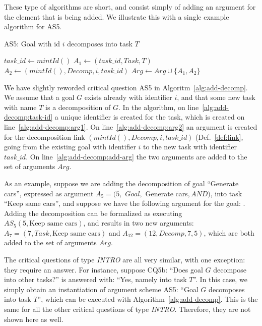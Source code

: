 These type of algorithms are short, and consist simply of adding an argument for the element that is being added. We illustrate this with a single example algorithm for AS5.

\begin{algorithm}[h]
  \caption{AS5: Goal with id $i$ decomposes into task $T$}\label{alg:add-decomp}
  \begin{algorithmic}[1]
    \State $task\_id\gets mintId()$\label{alg:add-decomp:task-id}
    \State $A_1\leftarrow (task\_id, Task, T)$\label{alg:add-decomp:arg1}
    \State $A_2\leftarrow (mintId(), Decomp, i, task\_id)$\label{alg:add-decomp:arg2}
    \State $Arg\gets Arg\cup \{A_1,A_2\}$\label{alg:add-decomp:add-arg}
    \EndProcedure
  \end{algorithmic}
\end{algorithm}

We have slightly reworded critical question AS5 in Algoritm~\ref{alg:add-decomp}. We assume that a goal $G$ exists already with identifier $i$, and that some new task with name $T$ is a decomposition of $G$. In the algorithm, on line~\ref{alg:add-decomp:task-id} a unique identifier is created for the task, which is created on line~\ref{alg:add-decomp:arg1}. On line~\ref{alg:add-decomp:arg2} an argument is created for the decomposition link $(mintId(), Decomp, i, task\_id)$ (Def.~\ref{def:link}, going from the existing goal with identifier $i$ to the new task with identifier $task\_id$. On line~\ref{alg:add-decomp:add-arg} the two arguments are added to the set of arguments $Arg$.

As an example, suppose we are adding the decomposition of goal ``Generate cars'', expressed as argument $A_5 = (5,$ $Goal,$ Generate cars$, AND)$, into task ``Keep same cars'', and suppose we have the following argument for the goal: . Adding the decomposition can be formalized as executing $AS_5(5, \text{Keep same cars})$, and results in two new arguments: $A_7 = (7, Task, \text{Keep same cars})$ and $A_{12} = (12, Decomp, 7, 5)$, which are both added to the set of arguments $Arg$.

The critical questions of type \emph{INTRO} are all very similar, with one exception: they require an answer. For instance, suppose CQ5b: ``Does goal $G$ decompose into other tasks?'' is answered with: ``Yes, namely into task $T$''. In this case, we simply obtain an instantiation of argument scheme AS5: ``Goal $G$ decomposes into task $T$'', which can be executed with Algorithm~\ref{alg:add-decomp}. This is the same for all the other critical questions of type \emph{INTRO}. Therefore, they are not shown here as well.

